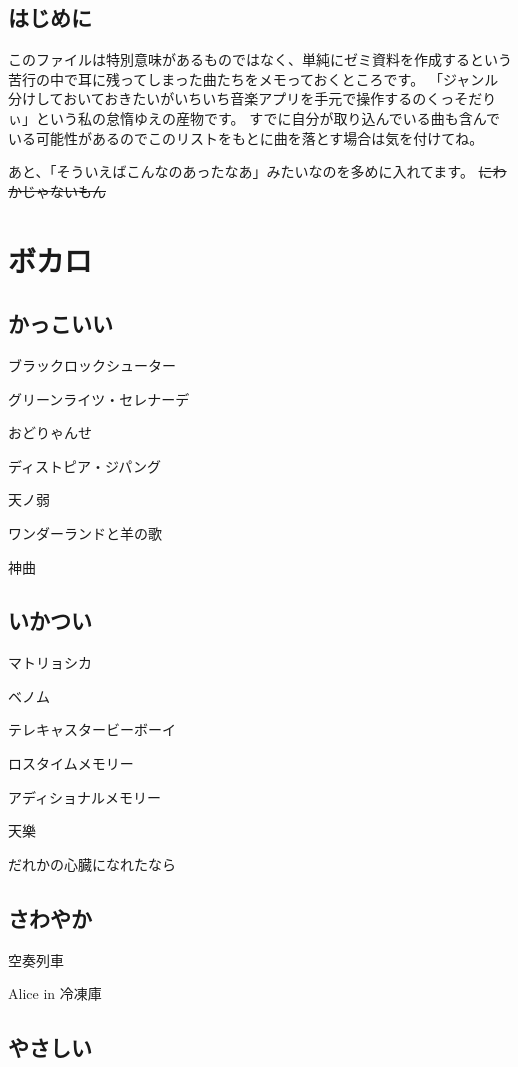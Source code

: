 \documentclass[12pt, dvipdfmx]{jsarticle}
\begin{document}
\subsection*{はじめに}

このファイルは特別意味があるものではなく、単純にゼミ資料を作成するという苦行の中で耳に残ってしまった曲たちをメモっておくところです。
「ジャンル分けしておいておきたいがいちいち音楽アプリを手元で操作するのくっそだりぃ」という私の怠惰ゆえの産物です。
すでに自分が取り込んでいる曲も含んでいる可能性があるのでこのリストをもとに曲を落とす場合は気を付けてね。

あと、「そういえばこんなのあったなあ」みたいなのを多めに入れてます。
\sout{にわかじゃないもん}

\section{ボカロ}
\subsection{かっこいい}

ブラックロックシューター

グリーンライツ・セレナーデ

おどりゃんせ

ディストピア・ジパング

天ノ弱

ワンダーランドと羊の歌

神曲

\subsection{いかつい}

マトリョシカ

ベノム

テレキャスタービーボーイ

ロスタイムメモリー

アディショナルメモリー

天樂

だれかの心臓になれたなら

\subsection{さわやか}

空奏列車

Alice in 冷凍庫

\subsection{やさしい}
\end{document}
